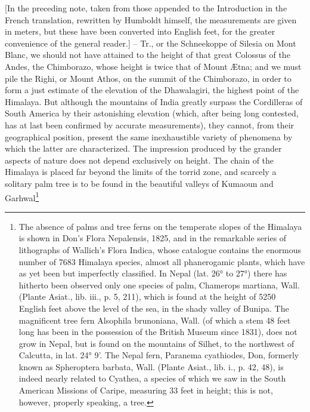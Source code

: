 {[In the preceding note, taken from those appended to the Introduction in the French translation, rewritten by Humboldt himself, the measurements are given in meters, but these have been converted into English feet, for the greater convenience of the general reader.] -- Tr.}, or the Schneekoppe of Silesia on Mont Blanc, we should not have attained to the height of that great Colossus of the Andes, the Chimborazo, whose height is twice that of Mount \AE tna; and we must pile the Righi, or Mount Athos, on the summit of the Chimborazo, in order to form a just estimate of the elevation of the Dhawalagiri, the highest point of the Himalaya. But although the mountains of India greatly surpass the Cordilleras of South America by their astonishing elevation (which, after being long contested, has at last been confirmed by accurate measurements), they cannot, from their geographical position, present the same inexhaustible variety of phenomena by which the latter are characterized. The impression produced by the grander aspects of nature does not depend exclusively on height. The chain of the Himalaya is placed far beyond the limits of the torrid zone, and scarcely a solitary palm tree is to be found in the beautiful valleys of Kumaoun and Garhwal\footnote{The absence of palms and tree ferns on the temperate slopes of the Himalaya is shown in Don's Flora Nepalensis, 1825, and in the remarkable series of lithographs of Wallich's Flora Indica, whose catalogue contains the enormous number of 7683 Himalaya species, almost all phanerogamic plants, which have as yet been but imperfectly classified. In Nepal (lat. 26° to 27°) there has hitherto been observed only one species of palm, Chamerops martiana, Wall. (Plante Asiat., lib. iii., p. 5, 211), which is found at the height of 5250 English feet above the level of the sea, in the shady valley of Bunipa. The magnificent tree fern Alsophila brunoniana, Wall. (of which a stem 48 feet long has been in the possession of the British Museum since 1831), does not grow in Nepal, but is found on the mountains of Silhet, to the northwest of Calcutta, in lat. 24° 9'. The Nepal fern, Paranema cyathiodes, Don, formerly known as Spheroptera barbata, Wall. (Plante Asiat., lib. i., p. 42, 48), is indeed nearly related to Cyathea, a species of which we saw in the South American Missions of Caripe, measuring 33 feet in height; this is not, however, properly speaking, a tree.
}
